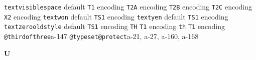 \documentclass[twoside]{ltxdoc}
\makeatletter
\renewenvironment{theindex}{%
   \@restonecoltrue
   \if@twocolumn\@restonecolfalse\fi
   \columnseprule \z@
   \columnsep 35\p@
   \twocolumn[\index@prologue]%
   \IndexParms
   \let\item\@idxitem
   \ignorespaces
}{\if@restonecol\onecolumn\else\clearpage\fi}
\makeatother
\begin{document}
\begin{theindex}
  \item \texttt  {textvisiblespace}\efill 
    \subitem default\pfill {}
    \subitem \texttt  {T1} encoding\pfill {}
    \subitem \texttt  {T2A} encoding\pfill {}
    \subitem \texttt  {T2B} encoding\pfill {}
    \subitem \texttt  {T2C} encoding\pfill {}
    \subitem \texttt  {X2} encoding\pfill {}
  \item \texttt  {textwon}\efill 
    \subitem default\pfill {}
    \subitem \texttt  {TS1} encoding\pfill {}
  \item \texttt  {textyen}\efill 
    \subitem default\pfill {}
    \subitem \texttt  {TS1} encoding\pfill {}
  \item \texttt  {textzerooldstyle}\efill 
    \subitem default\pfill {}
    \subitem \texttt  {TS1} encoding\pfill {}
  \item \texttt  {TH}\efill 
    \subitem \texttt  {T1} encoding\pfill {}
  \item \texttt  {th}\efill 
    \subitem \texttt  {T1} encoding\pfill {}
  \item \texttt  {@thirdofthree}\pfill a-147
  \item \texttt  {@typeset@protect}\pfill a-21, a-27, 
                a-160, a-168

  \indexspace
{\bfseries\hfil U\hfil}\nopagebreak


\end{theindex}
\end{document}
